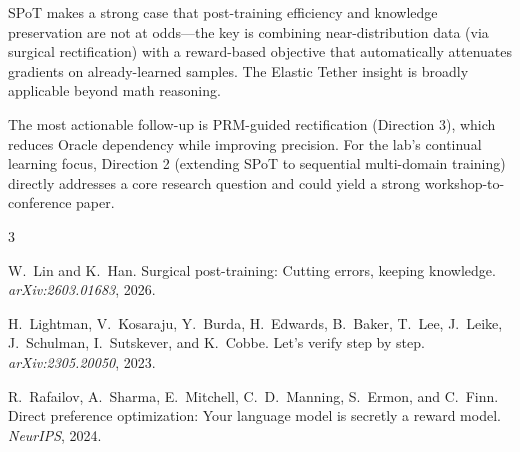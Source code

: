 \documentclass[11pt]{article}
\begin{document}
SPoT makes a strong case that post-training efficiency and knowledge preservation are not at odds---the key is combining near-distribution data (via surgical rectification) with a reward-based objective that automatically attenuates gradients on already-learned samples. The Elastic Tether insight is broadly applicable beyond math reasoning.

The most actionable follow-up is PRM-guided rectification (Direction 3), which reduces Oracle dependency while improving precision. For the lab's continual learning focus, Direction 2 (extending SPoT to sequential multi-domain training) directly addresses a core research question and could yield a strong workshop-to-conference paper.


\begin{thebibliography}{3}

W.~Lin and K.~Han.
\newblock Surgical post-training: Cutting errors, keeping knowledge.
\newblock \emph{arXiv:2603.01683}, 2026.

H.~Lightman, V.~Kosaraju, Y.~Burda, H.~Edwards, B.~Baker, T.~Lee, J.~Leike, J.~Schulman, I.~Sutskever, and K.~Cobbe.
\newblock Let's verify step by step.
\newblock \emph{arXiv:2305.20050}, 2023.

R.~Rafailov, A.~Sharma, E.~Mitchell, C.~D.~Manning, S.~Ermon, and C.~Finn.
\newblock Direct preference optimization: Your language model is secretly a reward model.
\newblock \emph{NeurIPS}, 2024.

\end{thebibliography}
\end{document}

